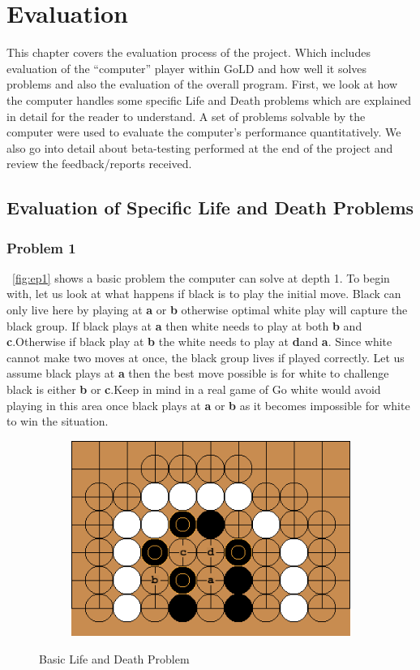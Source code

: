 \documentclass{l4proj}
\newcommand{\bo}[1]{\textbf{#1}}
\begin{document}
\chapter{Evaluation}

This chapter covers the evaluation process of the project. Which includes evaluation of the “computer” player within GoLD and how well it solves problems and also the evaluation of the overall program.  First, we look at how the computer handles some specific Life and Death problems which are explained in detail for the reader to understand. A set of problems solvable by the computer were used to evaluate the computer’s performance quantitatively. We also go into detail about beta-testing performed at the end of the project and review the feedback/reports received.

\section{Evaluation of Specific Life and Death Problems}
\subsection{Problem 1}
~\autoref{fig:ep1}  shows a basic problem the computer can solve at depth 1. To begin with, let us look at what happens if black is to play the initial move. Black can only live here by playing at \bo{a} or \bo{b} otherwise optimal white play will capture the black group. If black plays at \bo{a} then white needs to play at both \bo{b} and \bo{c}.Otherwise if black play at \bo{b} the white needs to play at \bo{d}and \bo{a}. Since white cannot make two moves at once, the black group lives if played correctly. Let us assume black plays at \bo{a} then the best move possible is for white to challenge black is either \bo{b} or \bo{c}.Keep in mind in a real game of Go white would avoid playing in this area once black plays at \bo{a} or \bo{b} as it becomes impossible for white to win the situation.
\begin{figure}[!ht]
\centering
\begin{subfigure}[b]{0.8\textwidth}
\includegraphics[width=\textwidth]{ep1/1.png}
\end{subfigure}
\caption{Basic Life and Death Problem}
\label{fig:ep1}
\end{figure}
\end{document}
